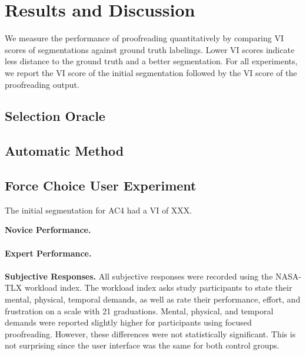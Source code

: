 \section{Results and Discussion}

We measure the performance of proofreading quantitatively by comparing VI scores of segmentations against ground truth labelings. Lower VI scores indicate less distance to the ground truth and a better segmentation. For all experiments, we report the VI score of the initial segmentation followed by the VI score of the proofreading output.

\subsection{Selection Oracle}

\subsection{Automatic Method}

\subsection{Force Choice User Experiment}

The initial segmentation for AC4 had a VI of XXX. 

\textbf{Novice Performance.} 
\\~\\
\textbf{Expert Performance.}
\\~\\
\textbf{Subjective Responses.} All subjective responses were recorded using the NASA-TLX workload index. The workload index asks study participants to state their mental, physical, temporal demands, as well as rate their performance, effort, and frustration on a scale with 21 graduations. Mental, physical, and temporal demands were reported slightly higher for participants using focused proofreading. However, these differences were not statistically significant. This is not surprising since the user interface was the same for both control groups.

